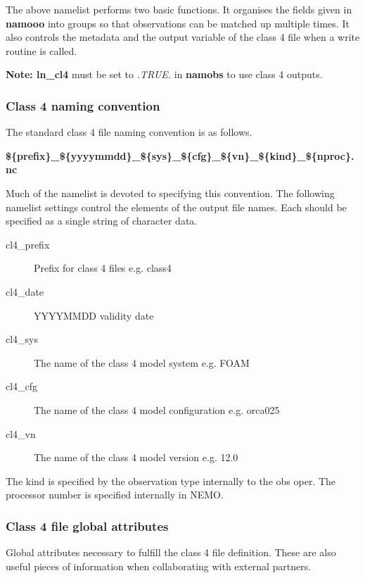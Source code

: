 The above namelist performs two basic functions. It organises the fields
given in \textbf{namooo} into groups so that observations can be matched
up multiple times. It also controls the metadata and the output variable
of the class 4 file when a write routine is called.

\textbf{Note: ln\_cl4} must be set to \emph{.TRUE.} in \textbf{namobs} 
to use class 4 outputs.

\subsubsection{Class 4 naming convention}

The standard class 4 file naming convention is as follows.

\noindent
\linebreak
\textbf{\$\{prefix\}\_\$\{yyyymmdd\}\_\$\{sys\}\_\$\{cfg\}\_\$\{vn\}\_\$\{kind\}\_\$\{nproc\}.nc}

\noindent
\linebreak
Much of the namelist is devoted to specifying this convention. The
following namelist settings control the elements of the output
file names. Each should be specified as a single string of character data.

\begin{description}
\item[cl4\_prefix]
Prefix for class 4 files e.g. class4
\item[cl4\_date]
YYYYMMDD validity date
\item[cl4\_sys]
The name of the class 4 model system e.g. FOAM
\item[cl4\_cfg]
The name of the class 4 model configuration e.g. orca025
\item[cl4\_vn]
The name of the class 4 model version e.g. 12.0
\end{description}

\noindent
The kind is specified by the observation type internally to the obs oper. The processor
number is specified internally in NEMO. 

\subsubsection{Class 4 file global attributes}

Global attributes necessary to fulfill the class 4 file definition. These
are also useful pieces of information when collaborating with external
partners.

